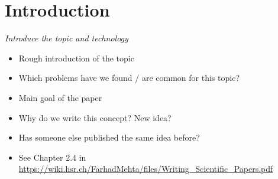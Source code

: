 \chapter{Introduction}
\label{sec:introduction}

\textit{Introduce the topic and technology}
\begin{itemize}
    \item Rough introduction of the topic
    \item Which problems have we found / are common for this topic?
    \item Main goal of the paper
    \item Why do we write this concept? New idea?
    \item Has someone else published the same idea before?
    \item See Chapter 2.4 in  \url{https://wiki.hsr.ch/FarhadMehta/files/Writing_Scientific_Papers.pdf}
\end{itemize}
